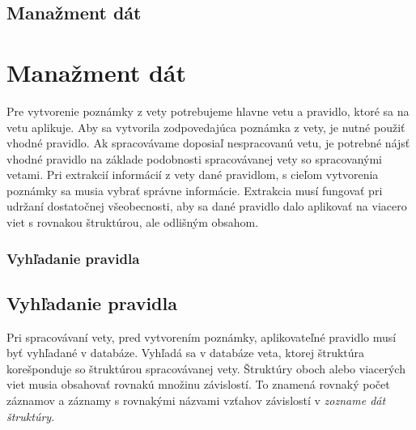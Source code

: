 %
%
{
	\subsection{Manažment dát}
}
{
	\section{Manažment dát}
}
\label{subsection:data_management}
Pre vytvorenie poznámky z vety potrebujeme hlavne vetu a pravidlo, ktoré sa na vetu aplikuje. Aby sa vytvorila zodpovedajúca poznámka z vety, je nutné použiť vhodné pravidlo. Ak spracovávame doposiaľ nespracovanú vetu, je potrebné nájsť vhodné pravidlo na základe podobnosti spracovávanej vety so spracovanými vetami. Pri extrakcií informácií z vety dané pravidlom, s cieľom vytvorenia poznámky sa musia vybrať správne informácie. Extrakcia musí fungovať pri udržaní dostatočnej všeobecnosti, aby sa dané pravidlo dalo aplikovať na viacero viet s rovnakou štruktúrou, ale odlišným obsahom.

%
%
{
	\subsubsection{Vyhľadanie pravidla}
}
{
	\subsection{Vyhľadanie pravidla}
}

\label{subsubsection:rule_lookup}
Pri spracovávaní vety, pred vytvorením poznámky, aplikovateľné pravidlo musí byť vyhľadané v databáze. Vyhľadá sa v databáze veta, ktorej štruktúra korešponduje so štruktúrou spracovávanej vety. Štruktúry oboch alebo viacerých viet musia obsahovať rovnakú množinu závislostí. To znamená rovnaký počet záznamov a záznamy s rovnakými názvami vzťahov závislostí v \textit{zozname dát štruktúry}.

